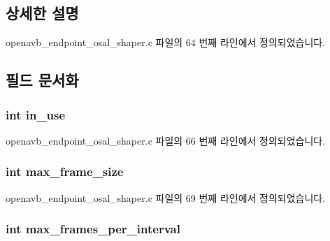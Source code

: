 \subsection{상세한 설명}


openavb\+\_\+endpoint\+\_\+osal\+\_\+shaper.\+c 파일의 64 번째 라인에서 정의되었습니다.



\subsection{필드 문서화}
\subsubsection[{\texorpdfstring{in\+\_\+use}{in_use}}]{\setlength{\rightskip}{0pt plus 5cm}int in\+\_\+use}\hypertarget{structshaper__reservation_acd374dc544502235efa3c6533c75820f}{}\label{structshaper__reservation_acd374dc544502235efa3c6533c75820f}


openavb\+\_\+endpoint\+\_\+osal\+\_\+shaper.\+c 파일의 66 번째 라인에서 정의되었습니다.

\subsubsection[{\texorpdfstring{max\+\_\+frame\+\_\+size}{max_frame_size}}]{\setlength{\rightskip}{0pt plus 5cm}int max\+\_\+frame\+\_\+size}\hypertarget{structshaper__reservation_a09c29b0090a82147afdb50ae0013b9c6}{}\label{structshaper__reservation_a09c29b0090a82147afdb50ae0013b9c6}


openavb\+\_\+endpoint\+\_\+osal\+\_\+shaper.\+c 파일의 69 번째 라인에서 정의되었습니다.

\subsubsection[{\texorpdfstring{max\+\_\+frames\+\_\+per\+\_\+interval}{max_frames_per_interval}}]{\setlength{\rightskip}{0pt plus 5cm}int max\+\_\+frames\+\_\+per\+\_\+interval}\hypertarget{structshaper__reservation_aace8d964835e57882addf0f51cb64f86}{}\label{structshaper__reservation_aace8d964835e57882addf0f51cb64f86}


